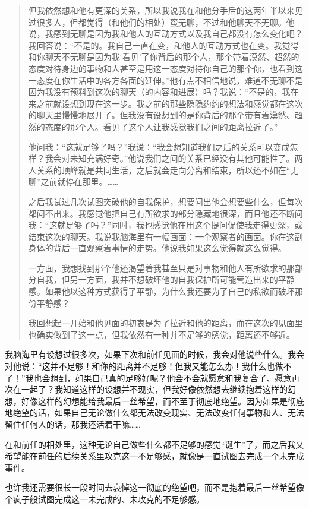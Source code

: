 \blockquote{
	但我依然想和他有更深的关系，所以我说我在和他分手后的这两年半以来见过很多人，但都觉得（和他们的相处）蛮无聊，不过和他聊天不无聊。他说，我感到无聊是因为我和他人的互动方式以及我自己都没有怎么变化吧？我回答说：“不是的。我自己一直在变，和他人的互动方式也在变。我觉得和你聊天不无聊是因为我‘看见’了你背后的那个人，那个带着漠然、超然的态度对待身边的事物和人甚至是用这一态度对待你自己的那个你，也看到这一态度在你生活中的各方各面的延伸。”他有点不相信地说，难道不无聊不是因为我没有预料到这次的聊天（的内容和进展）吗？我说：“不是的，我在来之前就设想到现在这一步。我之前的那些隐隐约约的想法和感觉都在这次的聊天里慢慢地展开了。但我没有设想到的是你背后的那个带有着漠然、超然的态度的那个人。看见了这个人让我感觉我们之间的距离拉近了。”

	他问我：“这就足够了吗？”我说：“我会想知道我们之后的关系可以变成怎样？我会对未知充满好奇。”他说我们之间的关系已经没有其他可能性了。两人关系的顶峰就是共同生活，之后就会走向分离和结束，所以还不如在“无聊”之前就停在那里。……

	之后我试过几次试图突破他的自我保护，想要问出他会想要些什么，但每次都问不出来。我感觉他把自己有所欲求的部分隐藏地很深，而且他还不断问我：“这就足够了吗？”同时，我也感觉他在用这个提问促使我走得更深，或结束这次的聊天。我说我脑海里有一幅画面：一个观察者的画面。你在这副身体的背后一直观察着事情的走势。他说我如果这么觉得就这么觉得。

	一方面，我想找到那个他还渴望着我甚至只是对事物和他人有所欲求的那部分自我，但另一方面，我并不想破坏他的自我保护所可能营造出来的平静感。如果他以这种方式获得了平静，为什么我还要为了自己的私欲而破坏那份平静感？

	我回想起一开始和他见面的初衷是为了拉近和他的距离，而在这次的见面里也确实做到了这一点，但我依然有一种并不足够的感觉，距离还不够近。

}

我脑海里有设想过很多次，如果下次和前任见面的时候，我会对他说些什么。我会对他说：“这并不足够！和你的距离并不足够！但我又能怎么办！我什么也做不了！”我也会想到，如果自己真的足够好呢？他会不会就愿意和我复合了、愿意再次在一起了？我知道这样的设想并不现实，但我好像依然想去继续抱着这样的幻想，好像这样的幻想能给我最后一丝希望，而不至于彻底地绝望。因为如果是彻底地绝望的话，如果自己无论做什么都无法改变现实、无法改变任何事物和人、无法留住任何人的话，那我还活着干嘛……

在和前任的相处里，这种无论自己做些什么都不足够的感觉“诞生”了，而之后我又希望能在前任的后续关系里攻克这一不足够感，就像是一直试图去完成一个未完成事件。

也许我还需要很长一段时间去哀悼这一彻底的绝望吧，而不是抱着最后一丝希望像个疯子般试图完成这一未完成的、未攻克的不足够感。

